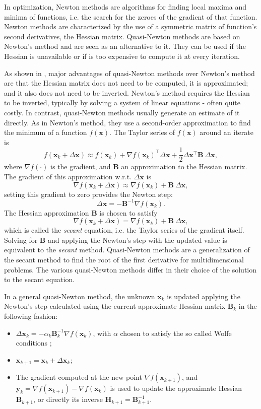 In optimization, Newton methods are algorithms for finding local maxima
and minima of functions, i.e. the search for the zeroes of the gradient
of that function. Newton methods are characterized by the use of a
symmetric matrix of function's second derivatives, the Hessian matrix.
Quasi-Newton methods are based on Newton's method and are seen as an
alternative to it. They can be used if the Hessian is unavailable or if
is too expensive to compute it at every iteration.

As shown in , major advantages of
quasi-Newton methods over Newton's method are that the Hessian matrix
does not need to be computed, it is approximated; and it also does not
need to be inverted. Newton's method requires the Hessian to be
inverted, typically by solving a system of linear equations - often
quite costly. In contrast, quasi-Newton methods usually generate an
estimate of it directly. As in Newton's method, they use a second-order
approximation to find the minimum of a function \(f(\bm{x})\). The
Taylor series of \(f(\bm{x})\) around an iterate is
\[
  f(\bm{x}_{k} + \Delta\bm{x})\approx
  f(\bm{x}_{k}) + \nabla f(\bm{x}_{k})^{\top}\Delta\bm{x} +
  \frac{1}{2} \Delta\bm{x}^{\top}\mathbf{B}~\Delta\bm{x},
\]
where \(\nabla f(\cdot)\) is the gradient, and \(\mathbf{B}\) an
approximation to the Hessian matrix. The gradient of this approximation
w.r.t. \(\Delta\bm{x}\) is
\[
  \nabla f(\bm{x}_{k} + \Delta\bm{x}) \approx
  \nabla f(\bm{x}_{k}) + \mathbf{B}~\Delta\bm{x},
\]
setting this gradient to zero provides the Newton step:
\[
  \Delta\bm{x} = - \mathbf{B}^{-1}\nabla f(\bm{x}_{k}).
\]
The Hessian approximation \(\mathbf{B}\) is chosen to satisfy
\[
  \nabla f(\bm{x}_{k} + \Delta\bm{x}) =
  \nabla f(\bm{x}_{k}) + \mathbf{B}~\Delta\bm{x},
\]
which is called the \textit{secant} equation, i.e. the Taylor series of
the gradient itself. Solving for \(\mathbf{B}\) and applying the
Newton's step with the updated value is equivalent to the
\textit{secant} method. Quasi-Newton methods are a generalization of the
secant method to find the root of the first derivative for
multidimensional problems. The various quasi-Newton methods differ in
their choice of the solution to the secant equation.

In a general quasi-Newton method, the unknown \(\bm{x}_{k}\) is
updated applying the Newton's step calculated using the current
approximate Hessian matrix \(\mathbf{B}_{k}\) in the following fashion:
\begin{itemize}
\item \(\Delta \bm{x}_{k} = -\alpha_{k}\mathbf{B}_{k}^{-1}\nabla
  f(\bm{x}_{k})\), with \(\alpha\) chosen to satisfy the so called
  Wolfe conditions \cite[p.~34]{nocedal&wright};

\item \(\bm{x}_{k+1} = \bm{x}_{k} + \Delta\bm{x}_{k}\);

\item The gradient computed at the new point \(\nabla
  f(\bm{x}_{k+1})\), and \(\mathbf{y}_{k} = \nabla
  f(\bm{x}_{k+1}) - \nabla f(\bm{x}_{k})\) is used to update the
  approximate Hessian \(\mathbf{B}_{k+1}\), or directly its inverse
  \(\mathbf{H}_{k+1} = \mathbf{B}_{k+1}^{-1}\).
\end{itemize}

